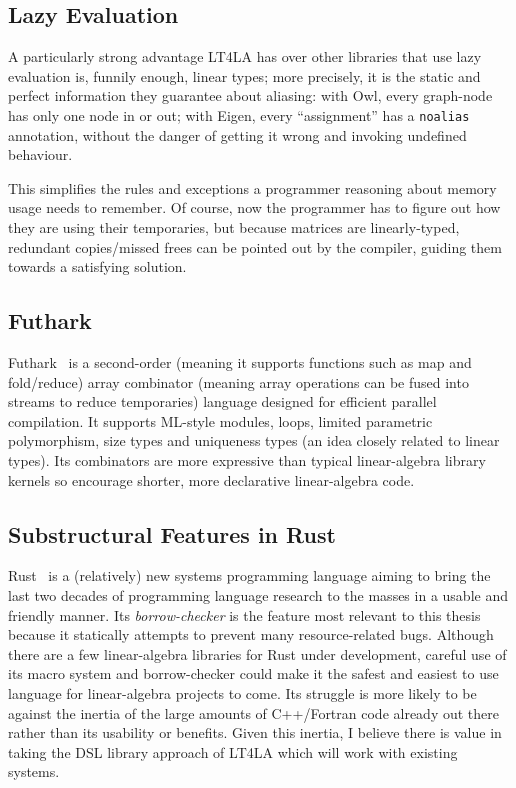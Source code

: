 \subsection{Lazy Evaluation}

A particularly strong advantage LT4LA has over other libraries that use lazy
evaluation is, funnily enough, linear types; more precisely, it is the static
and perfect information they guarantee about aliasing: with Owl, every
graph-node has only one node in or out; with Eigen, every ``assignment'' has a
\texttt{noalias} annotation, without the danger of getting it wrong and
invoking undefined behaviour.

This simplifies the rules and exceptions a programmer reasoning about memory
usage needs to remember. Of course, now the programmer has to figure out how
they are using their temporaries, but because matrices are linearly-typed,
redundant copies/missed frees can be pointed out by the compiler, guiding them
towards a satisfying solution.

\subsection{Futhark}

Futhark~\cite{futhark} is a second-order (meaning it supports functions such as
map and fold/reduce) array combinator (meaning array operations can be fused
into streams to reduce temporaries) language designed for efficient parallel
compilation. It supports ML-style modules, loops, limited parametric
polymorphism, size types and uniqueness types (an idea closely related to
linear types). Its combinators are more expressive than typical linear-algebra
library kernels so encourage shorter, more declarative linear-algebra code.

\subsection{Substructural Features in Rust}

Rust~\cite{rust} is a (relatively) new systems programming language aiming to
bring the last two decades of programming language research to the masses in a
usable and friendly manner. Its \emph{borrow-checker} is the feature most
relevant to this thesis because it statically attempts to prevent many
resource-related bugs. Although there are a few linear-algebra libraries for
Rust under development, careful use of its macro system and borrow-checker
could make it the safest and easiest to use language for linear-algebra
projects to come. Its struggle is more likely to be against the inertia of the
large amounts of C++/Fortran code already out there rather than its usability
or benefits. Given this inertia, I believe there is value in taking the DSL
library approach of LT4LA which will work with existing systems.

